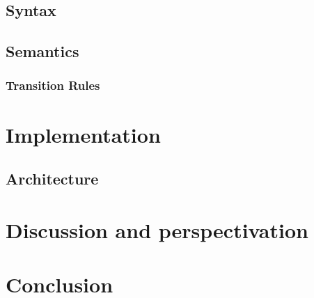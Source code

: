 \section{Syntax}
\section{Semantics}
\subsection{Transition Rules}

\renewcommand{\ind}[1]{}
\chapter{Implementation}
\label{chap:implementation}
\ind{ImplementaitionIntro}
\ind{EvaluationCriteria}
\section{Architecture}
\ind{Architecture}	
\ind{Hardware}
\ind{OverviewCompiler}
\ind{compilerchoice}
\ind{languageprocessing}
\ind{CompilationPasses}
\ind{AbstractSyntaxTrees}
\ind{ParseTree}
\ind{VisitorPattern}
\ind{SyntacticAnalysis}
\ind{KnownLexersAndParsers}
\ind{ANTLR}
\ind{LexicalAnalyzer}
\ind{Tokens}
\ind{Parser}
\ind{ContextualAnalysis}
\ind{Scoping}
\ind{Typechecking}
\ind{TheoryCodeGeneration}
\ind{CodeGeneration}
\ind{UnitTests}
\ind{ComponentSetup}
\ind{TestComponent}

\renewcommand{\ind}[1]{}
\chapter{Discussion and perspectivation}
\label{chap:disper}
\ind{FormaliaDiscussion}
\ind{FormaliaPerspektivering}

\chapter{Conclusion}
\ind{FormaliaKonklusion}


